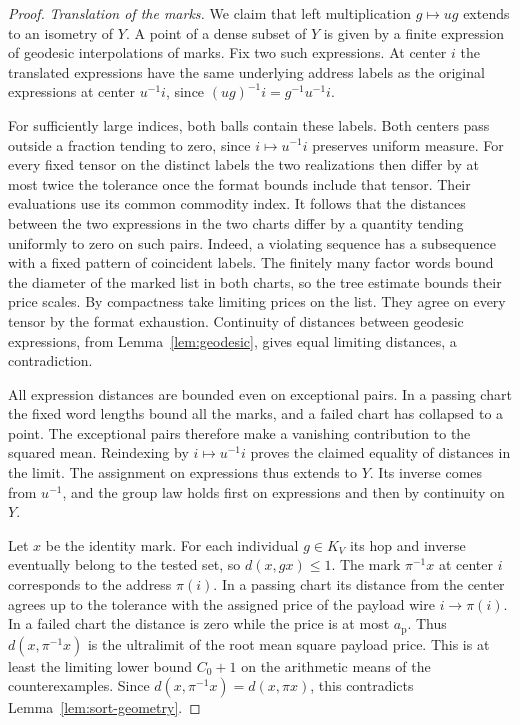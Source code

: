 \begin{proof}
\smallskip\noindent
\emph{Translation of the marks.}
We claim that left multiplication $g\mapsto ug$ extends to an
isometry of $Y$. A point of a dense subset of $Y$ is given by a
finite expression of geodesic interpolations of marks. Fix two such
expressions. At center $i$ the translated expressions have the
same underlying address labels as the original expressions at center
$u^{-1}i$, since $(ug)^{-1}i=g^{-1}u^{-1}i$.

For sufficiently large indices, both balls contain these labels.
Both centers pass outside a fraction tending to zero, since
$i\mapsto u^{-1}i$ preserves uniform measure. For every fixed tensor
on the distinct labels the two realizations then differ by at most
twice the tolerance once the format bounds include that tensor.
Their evaluations use its common commodity index. It follows that
the distances between the two expressions in the two charts differ
by a quantity tending uniformly to zero on such pairs. Indeed, a
violating sequence has a subsequence with a fixed pattern of coincident
labels. The finitely many factor words bound the diameter of the
marked list in both charts, so the tree estimate bounds their price
scales. By compactness take limiting prices on the list. They agree
on every tensor by the format exhaustion. Continuity of distances
between geodesic expressions, from Lemma~\ref{lem:geodesic}, gives
equal limiting distances, a contradiction.

All expression distances are bounded even on exceptional pairs.
In a passing chart the fixed word lengths bound all the marks, and
a failed chart has collapsed to a point. The exceptional pairs
therefore make a vanishing contribution to the squared mean. Reindexing
by $i\mapsto u^{-1}i$ proves the claimed equality of distances in the
limit. The assignment on expressions thus extends to $Y$. Its inverse
comes from $u^{-1}$, and the group law holds first on expressions and
then by continuity on $Y$.

Let $x$ be the identity mark. For each individual $g\in K_V$ its hop
and inverse eventually belong to the tested set, so $d(x,gx)\le1$.
The mark $\pi^{-1}x$ at center $i$ corresponds to the address $\pi(i)$.
In a passing chart its distance from the center agrees up to the
tolerance with the assigned price of the payload wire $i\to\pi(i)$.
In a failed chart the distance is zero while the price is at most
$a_{\mathrm p}$. Thus $d(x,\pi^{-1}x)$ is the ultralimit of the root
mean square payload price. This is at least the limiting lower bound
$C_0+1$ on the arithmetic means of the counterexamples.
Since $d(x,\pi^{-1}x)=d(x,\pi x)$, this contradicts
Lemma~\ref{lem:sort-geometry}.
\end{proof}


